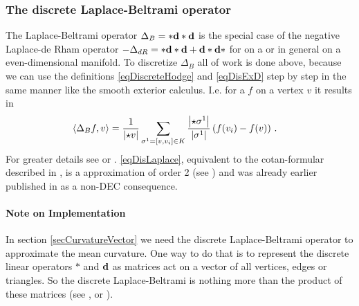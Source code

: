     \subsubsection{The discrete Laplace-Beltrami operator} \label{secDisLaplaceBeltrami}
      The Laplace-Beltrami operator \( \Delta_{B}= * \mathbf{d} * \mathbf{d} \) is the special case of the negative Laplace-de Rham operator
      \( -\Delta_{dR} = *\mathbf{d} *\mathbf{d} + \mathbf{d} *\mathbf{d} * \) for  on a  or in general on a even-dimensional manifold.
      To discretize \( \Delta_{B} \) all of work is done above,
      because we can use the definitions \eqref{eqDiscreteHodge} and \eqref{eqDisExD} step by step in the same manner like the smooth exterior
      calculus.
      I.e. for a  \( f \) on a vertex \( v \) it results in
      \begin{align}
        \label{eqDisLaplace}
        \left\langle \Delta_{B} f, v \right\rangle
                &= \frac{1}{\left| \star v \right|} \sum_{\sigma^{1}=\left[ v,v_{i} \right]\in K} \frac{\left| \star\sigma^{1} \right|}{\left| \sigma^{1} \right|}
                       \left( f(v_{i}) - f(v) \right) \,\text{.}
      \end{align}
      For greater details see \cite{hirani} or \cite{desbrun}. 
      \eqref{eqDisLaplace}, equivalent to the cotan-formular described in \cite{meyer}, is a approximation of order 2 (see \cite{xu})
      and was already earlier published in \cite{arakawa} as a non-DEC consequence. 

      \paragraph{Note on Implementation}
        In section \ref{secCurvatureVector} we need the discrete Laplace-Beltrami operator to approximate the mean curvature.
        One way to do that is to represent the discrete linear operators \( * \) and \( \mathbf{d} \) as matrices act on
        a vector of all vertices, edges or triangles.
        So the discrete Laplace-Beltrami is nothing more than the product of these matrices 
        (see \cite{siggraphKap8}, \cite{pydec} or \cite{crane}).
        
